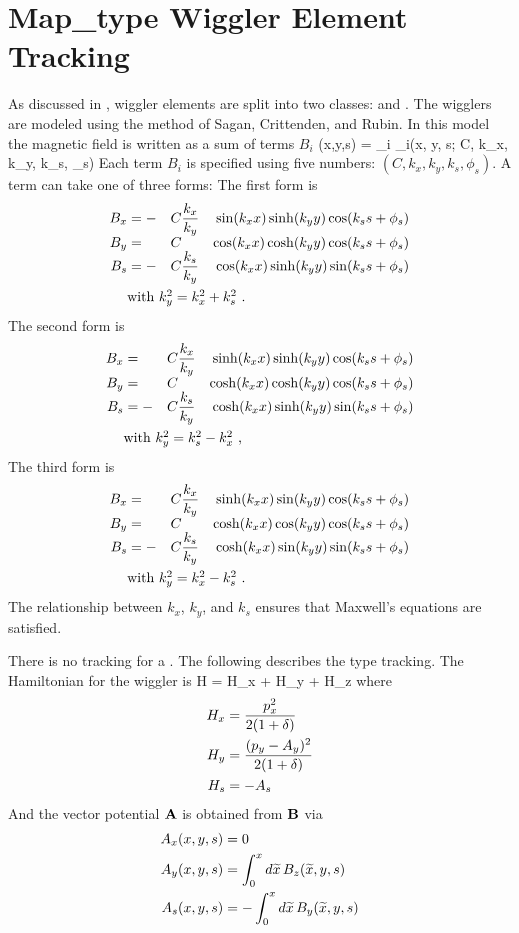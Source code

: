 \section{Map\_type Wiggler Element Tracking}
\label{s:wiggler.map.std}

As discussed in , \bmad wiggler elements are
split into two classes:  and . The 
 wigglers are modeled using the method of Sagan, Crittenden,
and Rubin\cite{b:wiggler}. In this model the magnetic field is written
as a sum of terms $B_i$
\Begineq
  \bfB(x,y,s) = \sum_i \bfB_i(x, y, s; C, k_x, k_y, k_s, \phi_s)
\Endeq 
Each term $B_i$ is specified using five numbers: 
$(C, k_x, k_y, k_s, \phi_s)$. A term can take one of three forms: The first
form is
\begin{alignat}{4}
  B_x &= -&C &\dfrac{k_x}{k_y} & \sin(\kxx) \sinh(\kyy) \cos(\ksss) \CRNEG
  B_y &=  &C &                 & \cos(\kxx) \cosh(\kyy) \cos(\ksss) \CRNEG
  B_s &= -&C &\dfrac{k_s}{k_y} & \cos(\kxx) \sinh(\kyy) \sin(\ksss) \label{f1} \\
  & \makebox[1pt][l]{with $k_y^2 = k_x^2 + k_s^2$ .} &&&  \nonumber
\end{alignat}
The second form is
\begin{alignat}{4}
  B_x &=  &C &\dfrac{k_x}{k_y} & \sinh(\kxx) \sinh(\kyy) \cos(\ksss) \CRNEG
  B_y &=  &C &                 & \cosh(\kxx) \cosh(\kyy) \cos(\ksss) \CRNEG
  B_s &= -&C &\dfrac{k_s}{k_y} & \cosh(\kxx) \sinh(\kyy) \sin(\ksss) \label{f2} \\
  & \makebox[1pt][l]{with $k_y^2 = k_s^2 - k_x^2$ ,} &&&  \nonumber
\end{alignat}
The third form is
\begin{alignat}{4}
  B_x &=  &C &\dfrac{k_x}{k_y} & \sinh(\kxx) \sin(\kyy) \cos(\ksss) \CRNEG
  B_y &=  &C &                 & \cosh(\kxx) \cos(\kyy) \cos(\ksss) \CRNEG
  B_s &= -&C &\dfrac{k_s}{k_y} & \cosh(\kxx) \sin(\kyy) \sin(\ksss) \label{f3} \\
  & \makebox[1pt][l]{with $k_y^2 = k_x^2 - k_s^2$ .} &&& \nonumber
\end{alignat}
The relationship between $k_x$, $k_y$, and $k_s$ ensures that
Maxwell's equations are satisfied.

There is no  tracking for a 
. The following describes the  type tracking.
The Hamiltonian for the wiggler is 
\Begineq
  H = H_x + H_y + H_z
\Endeq
where
\begin{align}
  H_x &= \frac{p_x^2}{2 (1 + \delta)} \nonumber \\
  H_y &= \frac{(p_y - A_y)^2}{2 (1 + \delta)} \\
  H_s &= - A_s \nonumber
\end{align}
And the vector potential ${\bf A}$ is obtained from ${\bf B}$ via
\begin{align}
  A_x(x,y,s) &= 0 \nonumber \\
  A_y(x,y,s) &=  \int_0^x d\widetilde x \, B_z(\widetilde x, y, s) 
  \label{a0a0a0} \\
  A_s(x,y,s) &= -\int_0^x d\widetilde x \, B_y(\widetilde x, y, s) \nonumber
\end{align}

